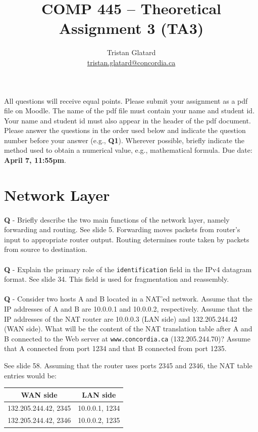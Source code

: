 \documentclass{llncs}
\title{COMP 445 -- Theoretical Assignment 3 (TA3)}
\author{Tristan Glatard\\
  \href{mailto:tristan.glatard@concordia.ca}{tristan.glatard@concordia.ca}\\
  \vspace*{0.3cm}
  }
\institute{Concordia University\\
  Department of Computer Science and Software Engineering}
\newcounter{ques}
\newcommand{\quest}[2]{\paragraph{}\textbf{Q\theques} - #1\stepcounter{ques} }
\newcommand{\answer}[1]{
\noindent\color{red}A: #1\color{black}}
\begin{document}
\maketitle

All questions will receive equal points. Please submit your assignment
as a pdf file on Moodle. The name of the pdf file must contain your
name and student id. Your name and student id must also appear in the
header of the pdf document. Please answer the questions in the order
used below and indicate the question number before your answer (e.g.,
\textbf{Q1}). Wherever possible, briefly indicate the method used to
obtain a numerical value, e.g., mathematical formula. Due date:
\textbf{April 7, 11:55pm}.

  \setlength{\tabcolsep}{12pt}

\section{Network Layer}

\quest{Briefly describe the two main functions of the network layer, namely forwarding and routing.}

\answer{See slide 5. Forwarding moves packets from router's input to
  appropriate router output. Routing determines route taken by packets
  from source to destination.}

\quest{Explain the primary role of the \texttt{identification} field in the IPv4 datagram format.}

\answer{See slide 34. This field is used for fragmentation and
  reassembly.}

\quest{Consider two hosts A and B located in a NAT'ed network. Assume
  that the IP addresses of A and B are 10.0.0.1 and 10.0.0.2,
  respectively. Assume that the IP addresses of the NAT router are
  10.0.0.3 (LAN side) and 132.205.244.42 (WAN side). What will be the
  content of the NAT translation table after A and B connected to the
  Web server at \texttt{www.concordia.ca} (132.205.244.70)? Assume
  that A connected from port 1234 and that B connected from port
  1235.}

\answer{See slide 58. Assuming that the router uses ports 2345 and 2346, the NAT table entries would be:\\
  \begin{tabular}{cc}
    WAN side              & LAN side \\
    \hline
    132.205.244.42, 2345  & 10.0.0.1, 1234 \\
    132.205.244.42, 2346  & 10.0.0.2, 1235 \\
  \end{tabular}
}
\end{document}
